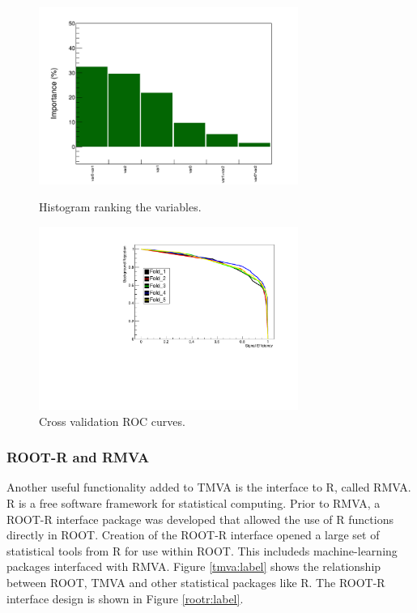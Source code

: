 \documentclass[a4paper]{jpconf}
\begin{document}
\begin{figure}[h]
\begin{minipage}{15pc}
\includegraphics[width=20pc]{img/vi.png}
\caption{\label{_vi} Histogram ranking the variables.}
\end{minipage}\hspace{2pc}%
\begin{minipage}{15pc}
\includegraphics[width=20pc]{img/cv.pdf}
\caption{\label{_cv} Cross validation ROC curves.}
\end{minipage}\hspace{2pc}%
\end{figure}


\subsubsection{ROOT-R and RMVA}\label{ROOTR}
Another useful functionality added to TMVA is the interface to R, called RMVA. R is a free software framework for statistical computing\cite{R}. Prior to RMVA, a ROOT-R interface package was developed that allowed the  use of R functions directly in ROOT. Creation of the ROOT-R interface opened a large set of statistical tools from R for use within ROOT. This includeds machine-learning packages interfaced with RMVA.
Figure \ref{tmva:label} shows the relationship between ROOT, TMVA and other statistical packages like R. 
The ROOT-R interface design is shown in Figure \ref{rootr:label}. 
\end{document}
